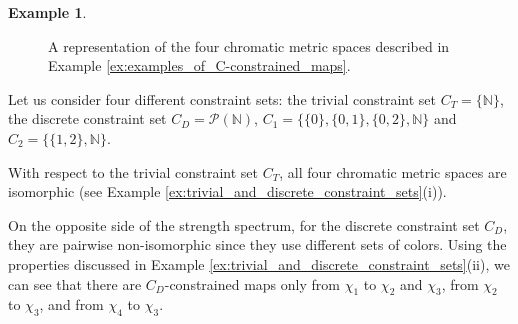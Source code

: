 \documentclass[8pt,a4paper,oneside,english,english]{article}
\theoremstyle{plain}
\theoremstyle
{plain}
\theoremstyle{definition}
\newtheorem{example}[theorem]{Example}%
\newcommand{\N}{\mathbb{N}}
\begin{document}
\begin{example}
\begin{figure}[h!]
\begin{subfigure}{0.245\textwidth}
    \end{subfigure}  
        \begin{subfigure}{0.245\textwidth}
    \end{subfigure}  
        \begin{subfigure}{0.245\textwidth}
    \end{subfigure} 
    \caption{\footnotesize A representation of the four chromatic metric spaces described in Example \ref{ex:examples_of_C-constrained_maps}.}
    \end{figure}\label{fig:example_cmp}

    Let us consider four different constraint sets: the trivial constraint set $C_T=\{\N\}$, the discrete constraint set  $C_D=\mathcal{P}(\N)$,
    $C_1=\{\{0\},\{0,1\},\{0,2\},\N\}$ and $C_2=\{\{1,2\},\N\}$. %
    
    With respect to the trivial constraint set $C_T$, all four chromatic metric spaces 
    are isomorphic (see Example \ref{ex:trivial_and_discrete_constraint_sets}(i)). 

    On the opposite side of the strength spectrum, for the discrete constraint set $C_D$, they are pairwise non-isomorphic since they use different sets of colors. Using the properties discussed in Example \ref{ex:trivial_and_discrete_constraint_sets}(ii), we can see that there are $C_D$-constrained maps only from $\chi_1$ to $\chi_2$ and $\chi_3$, from $\chi_2$ to $\chi_3$, and from $\chi_4$ to $\chi_3$. 


\end{example}
\end{document}
